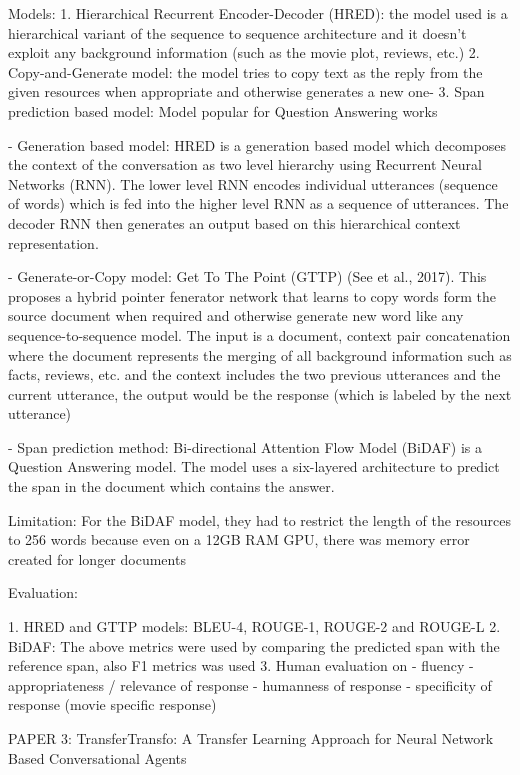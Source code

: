 Models:
1. Hierarchical Recurrent Encoder-Decoder (HRED): the model used is a hierarchical variant of the sequence to sequence architecture and it doesn't exploit any background information (such as the movie plot, reviews, etc.)
2. Copy-and-Generate model: the model tries to copy text as the reply from the given resources when appropriate and otherwise generates a new one-
3. Span prediction based model: Model popular for Question Answering works


- 	Generation based model:
	HRED is a generation based model which decomposes the context of the conversation as two level hierarchy using Recurrent Neural Networks (RNN). The lower level RNN encodes individual utterances (sequence of words) which is fed into the higher level RNN as a sequence of utterances. The decoder RNN then generates an output based on this hierarchical context representation.

- Generate-or-Copy model:
	Get To The Point (GTTP) (See et al., 2017). This proposes a hybrid pointer fenerator network that learns to copy words form the source document when required and otherwise generate new word like any sequence-to-sequence model.
	The input is a {document, context} pair concatenation where the document represents the merging of all background information such as facts, reviews, etc. and the context includes the two previous utterances and the current utterance, the output would be the response (which is labeled by the next utterance)
	
- Span prediction method:
	Bi-directional Attention Flow Model (BiDAF) is a Question Answering model. The model uses a six-layered architecture to predict the span in the document which contains the answer.
	
	Limitation:  For the BiDAF model, they had to restrict the length of the resources to 256 words because even on a 12GB RAM GPU, there was memory error created for longer documents
	
Evaluation:

1. HRED and GTTP models: BLEU-4, ROUGE-1, ROUGE-2 and ROUGE-L
2. BiDAF: The above metrics were used by comparing the predicted span with the reference span, also F1 metrics was used
3. Human evaluation on
	- fluency
	- appropriateness / relevance of response 
	- humanness of response
	- specificity of response (movie specific response)



PAPER 3:
TransferTransfo: A Transfer Learning Approach for Neural Network Based Conversational Agents

